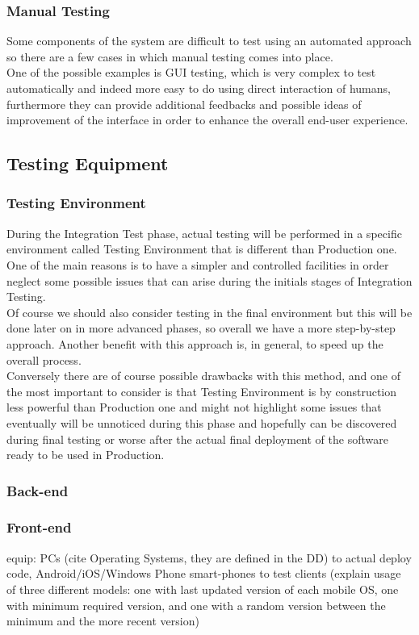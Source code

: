 \subsubsection{Manual Testing}
Some components of the system are difficult to test using an automated approach so there are a few cases in which manual testing comes into place. \\ One of the possible examples is GUI testing, which is very complex to test automatically and indeed more easy to do using direct interaction of humans, furthermore they can provide additional feedbacks and possible ideas of improvement of the interface in order to enhance the overall end-user experience. 

\subsection{Testing Equipment}

\subsubsection{Testing Environment}
During the Integration Test phase, actual testing will be performed in a specific environment called Testing Environment that is different than Production one. One of the main reasons is to have a simpler and controlled facilities in order neglect some possible issues that can arise during the initials stages of Integration Testing. \\ Of course we should also consider testing in the final environment but this will be done later on in more advanced phases, so overall we have a more step-by-step approach. Another benefit with this approach is, in general, to speed up the overall process. \\ Conversely there are of course possible drawbacks with this method, and one of the most important to consider is that Testing Environment is by construction less powerful than Production one and might not highlight some issues that eventually will be unnoticed during this phase and hopefully can be discovered during final testing or worse after the actual final deployment of the software ready to be used in Production.  

\subsubsection{Back-end}

\subsubsection{Front-end}

equip: PCs (cite Operating Systems, they are defined in the DD) to actual deploy code, Android/iOS/Windows Phone smart-phones to test clients (explain usage of three different models: one with last updated version of each mobile OS, one with minimum required version, and one with a random version between the minimum and the more recent version)